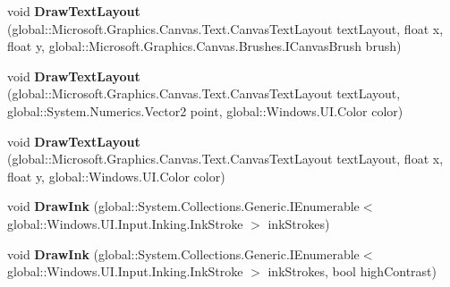 \begin{DoxyCompactItemize}
\item 
\mbox{\label{interface_microsoft_1_1_graphics_1_1_canvas_1_1_i_canvas_drawing_session_a5fdd3af855c9e0450bfd6f462cf17c8d}} 
void {\bfseries Draw\+Text\+Layout} (global\+::\+Microsoft.\+Graphics.\+Canvas.\+Text.\+Canvas\+Text\+Layout text\+Layout, float x, float y, global\+::\+Microsoft.\+Graphics.\+Canvas.\+Brushes.\+I\+Canvas\+Brush brush)
\item 
\mbox{\label{interface_microsoft_1_1_graphics_1_1_canvas_1_1_i_canvas_drawing_session_adae0184397093ff10c5fbc9e4c3880d3}} 
void {\bfseries Draw\+Text\+Layout} (global\+::\+Microsoft.\+Graphics.\+Canvas.\+Text.\+Canvas\+Text\+Layout text\+Layout, global\+::\+System.\+Numerics.\+Vector2 point, global\+::\+Windows.\+U\+I.\+Color color)
\item 
\mbox{\label{interface_microsoft_1_1_graphics_1_1_canvas_1_1_i_canvas_drawing_session_a98fd13796da376ff0f34ec197798fd1b}} 
void {\bfseries Draw\+Text\+Layout} (global\+::\+Microsoft.\+Graphics.\+Canvas.\+Text.\+Canvas\+Text\+Layout text\+Layout, float x, float y, global\+::\+Windows.\+U\+I.\+Color color)
\item 
\mbox{\label{interface_microsoft_1_1_graphics_1_1_canvas_1_1_i_canvas_drawing_session_acb13ee3d1ee87b78cf2eeabb92ab6c66}} 
void {\bfseries Draw\+Ink} (global\+::\+System.\+Collections.\+Generic.\+I\+Enumerable$<$ global\+::\+Windows.\+U\+I.\+Input.\+Inking.\+Ink\+Stroke $>$ ink\+Strokes)
\item 
\mbox{\label{interface_microsoft_1_1_graphics_1_1_canvas_1_1_i_canvas_drawing_session_a6566b642a6f05aee158005f6050d913b}} 
void {\bfseries Draw\+Ink} (global\+::\+System.\+Collections.\+Generic.\+I\+Enumerable$<$ global\+::\+Windows.\+U\+I.\+Input.\+Inking.\+Ink\+Stroke $>$ ink\+Strokes, bool high\+Contrast)
\item 
\mbox{\label{interface_microsoft_1_1_graphics_1_1_canvas_1_1_i_canvas_drawing_session_aba72846c2319ebafdd0c9e33d94eb145}} 

\end{DoxyCompactItemize}
